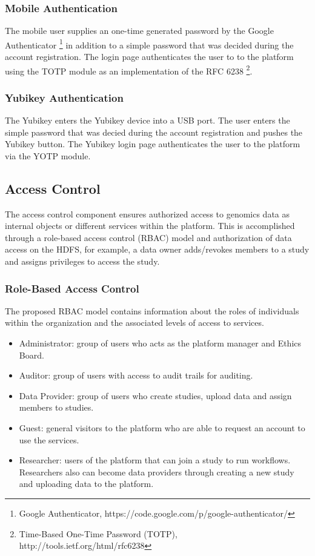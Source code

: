 \subsubsection {Mobile Authentication}
The mobile user supplies an one-time generated password by the Google Authenticator \footnote{Google Authenticator, https://code.google.com/p/google-authenticator/} in addition to a simple password that was decided during the account registration. The login page authenticates the user to to the platform using the TOTP module as an implementation of the RFC 6238 \footnote{Time-Based One-Time Password (TOTP), http://tools.ietf.org/html/rfc6238}.   

\subsubsection {Yubikey Authentication}
The Yubikey enters the Yubikey device into a USB port. The user enters the simple password that was decied during the account registration and pushes the Yubikey button. The Yubikey login page authenticates the user to the platform via the YOTP module.

\subsection {Access Control}
The access control component ensures authorized access to genomics data as internal objects or different services within the platform. This is accomplished through a role-based access control (RBAC) model and authorization of data access on the HDFS, for example, a data owner adds/revokes members to a study and assigns privileges to access the study.

\subsubsection {Role-Based Access Control}

The proposed RBAC model contains information about the roles of individuals within the organization and the associated levels of access to services.

\begin{itemize}
\item Administrator: group of users who acts as the platform manager and Ethics Board.

\item Auditor: group of users with access to audit trails for auditing.

\item Data Provider: group of users who create studies, upload data and assign members to studies.

\item Guest: general visitors to the platform who are able to request an account to use the services.

\item Researcher: users of the platform that can join a study to run workflows. Researchers also can become data providers through creating a new study and uploading data to the platform.

\end{itemize}


